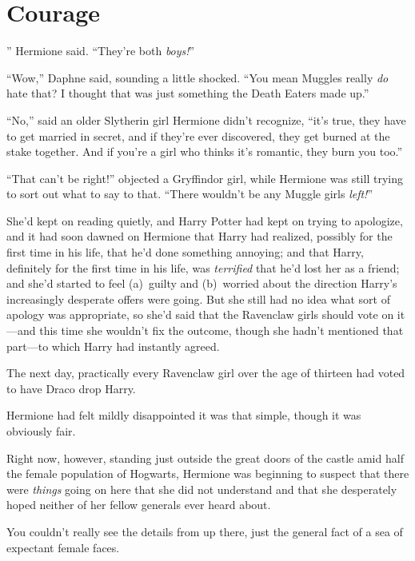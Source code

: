 \chapter{Courage}

” Hermione said. “They’re both \emph{boys!}”

\hplettrineextrapara
“Wow,” Daphne said, sounding a little shocked. “You mean Muggles really \emph{do} hate that? I thought that was just something the Death Eaters made up.”

“No,” said an older Slytherin girl Hermione didn’t recognize, “it’s true, they have to get married in secret, and if they’re ever discovered, they get burned at the stake together. And if you’re a girl who thinks it’s romantic, they burn you too.”

“That can’t be right!” objected a Gryffindor girl, while Hermione was still trying to sort out what to say to that. “There wouldn’t be any Muggle girls \emph{left!}”

She’d kept on reading quietly, and Harry Potter had kept on trying to apologize, and it had soon dawned on Hermione that Harry had realized, possibly for the first time in his life, that he’d done something annoying; and that Harry, definitely for the first time in his life, was \emph{terrified} that he’d lost her as a friend; and she’d started to feel (a)~guilty and (b)~worried about the direction Harry’s increasingly desperate offers were going. But she still had no idea what sort of apology was appropriate, so she’d said that the Ravenclaw girls should vote on it—and this time she wouldn’t fix the outcome, though she hadn’t mentioned that part—to which Harry had instantly agreed.

The next day, practically every Ravenclaw girl over the age of thirteen had voted to have Draco drop Harry.

Hermione had felt mildly disappointed it was that simple, though it was obviously fair.

Right now, however, standing just outside the great doors of the castle amid half the female population of Hogwarts, Hermione was beginning to suspect that there were \emph{things} going on here that she did not understand and that she desperately hoped neither of her fellow generals ever heard about.

\later

You couldn’t really see the details from up there, just the general fact of a sea of expectant female faces.

